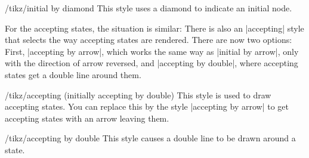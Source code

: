 \begin{stylekey}{/tikz/initial by diamond}
    This style uses a diamond to indicate an initial node.
\end{stylekey}

For the accepting states, the situation is similar: There is also an
|accepting| style that selects the way accepting states are rendered. There are
now two options: First, |accepting by arrow|, which works the same way as
|initial by arrow|, only with the direction of arrow reversed, and
|accepting by double|, where accepting states get a double line around them.

\begin{stylekey}{/tikz/accepting (initially accepting by double)}
    This style is used to draw accepting states.  You can replace this by the
    style |accepting by arrow| to get accepting states with an arrow leaving
    them.
\end{stylekey}

\begin{stylekey}{/tikz/accepting by double}
    This style causes a double line to be drawn around a state.
\end{stylekey}

